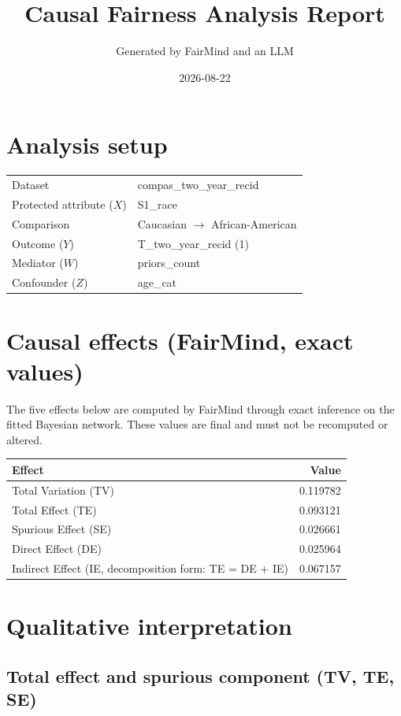 \documentclass[11pt]{article}
\title{Causal Fairness Analysis Report}
\author{Generated by FairMind and an LLM}
\date{2026-08-22}
\begin{document}
\maketitle

\section{Analysis setup}

\begin{tabular}{ll}
\toprule
Dataset & compas\_two\_year\_recid \\
Protected attribute ($X$) & S1\_race \\
Comparison & Caucasian $\to$ African-American \\
Outcome ($Y$) & T\_two\_year\_recid (1) \\
Mediator ($W$) & priors\_count \\
Confounder ($Z$) & age\_cat \\
\bottomrule
\end{tabular}

\section{Causal effects (FairMind, exact values)}

The five effects below are computed by FairMind through exact inference on the
fitted Bayesian network. These values are final and must not be recomputed or
altered.

\begin{tabular}{lr}
\toprule
Effect & Value \\
\midrule
Total Variation (TV) & 0.119782 \\
Total Effect (TE) & 0.093121 \\
Spurious Effect (SE) & 0.026661 \\
Direct Effect (DE) & 0.025964 \\
Indirect Effect (IE, decomposition form: TE = DE + IE) & 0.067157 \\
\bottomrule
\end{tabular}

\section{Qualitative interpretation}

\subsection{Total effect and spurious component (TV, TE, SE)}
\end{document}
